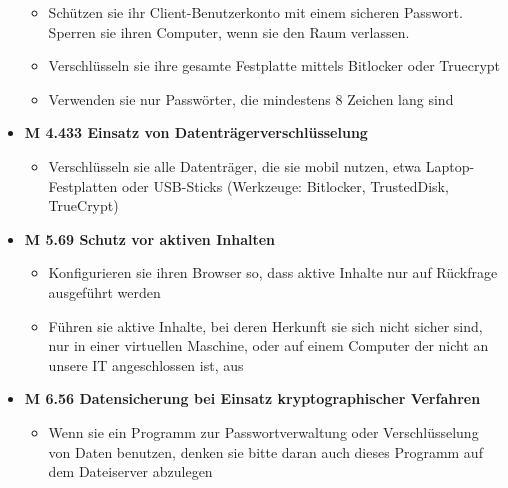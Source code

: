 \documentclass[]{article}
\begin{document}
\begin{itemize}
  \begin{itemize}
  \item
    Schützen sie ihr Client-Benutzerkonto mit einem sicheren Passwort.
    Sperren sie ihren Computer, wenn sie den Raum verlassen.
  \item
    Verschlüsseln sie ihre gesamte Festplatte mittels Bitlocker oder
    Truecrypt
  \item
    Verwenden sie nur Passwörter, die mindestens 8 Zeichen lang sind
  \end{itemize}
\item
  \textbf{M 4.433 Einsatz von Datenträgerverschlüsselung}

  \begin{itemize}
  \item
    Verschlüsseln sie alle Datenträger, die sie mobil nutzen, etwa
    Laptop-Festplatten oder USB-Sticks (Werkzeuge: Bitlocker,
    TrustedDisk, TrueCrypt)
  \end{itemize}
\item
  \textbf{M 5.69 Schutz vor aktiven Inhalten}

  \begin{itemize}
  \item
    Konfigurieren sie ihren Browser so, dass aktive Inhalte nur auf
    Rückfrage ausgeführt werden
  \item
    Führen sie aktive Inhalte, bei deren Herkunft sie sich nicht sicher
    sind, nur in einer virtuellen Maschine, oder auf einem Computer der
    nicht an unsere IT angeschlossen ist, aus
  \end{itemize}
\item
  \textbf{M 6.56 Datensicherung bei Einsatz kryptographischer Verfahren}

  \begin{itemize}
  \item
    Wenn sie ein Programm zur Passwortverwaltung oder Verschlüsselung
    von Daten benutzen, denken sie bitte daran auch dieses Programm auf
    dem Dateiserver abzulegen
  \end{itemize}
\end{itemize}
\end{document}
